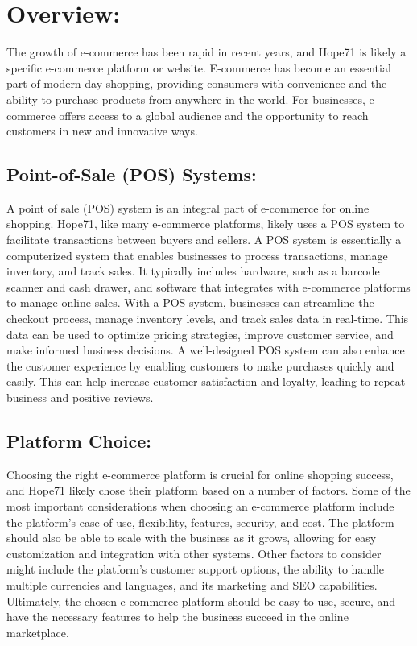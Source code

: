 \documentclass{article}
\begin{document}
\section{Overview:}
The growth of e-commerce has been rapid in recent years, and Hope71 is likely a specific e-commerce platform or website. E-commerce has become an essential part of modern-day shopping, providing consumers with convenience and the ability to purchase products from anywhere in the world. For businesses, e-commerce offers access to a global audience and the opportunity to reach customers in new and innovative ways.
\subsection{Point-of-Sale (POS) Systems:}
A point of sale (POS) system is an integral part of e-commerce for online shopping. Hope71, like many e-commerce platforms, likely uses a POS system to facilitate transactions between buyers and sellers. A POS system is essentially a computerized system that enables businesses to process transactions, manage inventory, and track sales. It typically includes hardware, such as a barcode scanner and cash drawer, and software that integrates with e-commerce platforms to manage online sales. With a POS system, businesses can streamline the checkout process, manage inventory levels, and track sales data in real-time. This data can be used to optimize pricing strategies, improve customer service, and make informed business decisions. A well-designed POS system can also enhance the customer experience by enabling customers to make purchases quickly and easily. This can help increase customer satisfaction and loyalty, leading to repeat business and positive reviews.
\subsection{Platform Choice:}
Choosing the right e-commerce platform is crucial for online shopping success, and Hope71 likely chose their platform based on a number of factors. Some of the most important considerations when choosing an e-commerce platform include the platform's ease of use, flexibility, features, security, and cost. The platform should also be able to scale with the business as it grows, allowing for easy customization and integration with other systems. Other factors to consider might include the platform's customer support options, the ability to handle multiple currencies and languages, and its marketing and SEO capabilities. Ultimately, the chosen e-commerce platform should be easy to use, secure, and have the necessary features to help the business succeed in the online marketplace.
\end{document}
